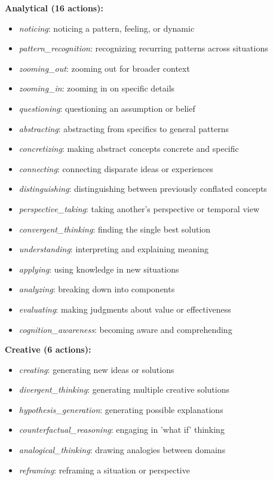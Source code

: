 \documentclass{article}
\begin{document}
\textbf{Analytical (16 actions):}
\begin{itemize}
    \item \textit{noticing}: noticing a pattern, feeling, or dynamic
    \item \textit{pattern\_recognition}: recognizing recurring patterns across situations
    \item \textit{zooming\_out}: zooming out for broader context
    \item \textit{zooming\_in}: zooming in on specific details
    \item \textit{questioning}: questioning an assumption or belief
    \item \textit{abstracting}: abstracting from specifics to general patterns
    \item \textit{concretizing}: making abstract concepts concrete and specific
    \item \textit{connecting}: connecting disparate ideas or experiences
    \item \textit{distinguishing}: distinguishing between previously conflated concepts
    \item \textit{perspective\_taking}: taking another's perspective or temporal view
    \item \textit{convergent\_thinking}: finding the single best solution
    \item \textit{understanding}: interpreting and explaining meaning
    \item \textit{applying}: using knowledge in new situations
    \item \textit{analyzing}: breaking down into components
    \item \textit{evaluating}: making judgments about value or effectiveness
    \item \textit{cognition\_awareness}: becoming aware and comprehending
\end{itemize}

\textbf{Creative (6 actions):}
\begin{itemize}
    \item \textit{creating}: generating new ideas or solutions
    \item \textit{divergent\_thinking}: generating multiple creative solutions
    \item \textit{hypothesis\_generation}: generating possible explanations
    \item \textit{counterfactual\_reasoning}: engaging in 'what if' thinking
    \item \textit{analogical\_thinking}: drawing analogies between domains
    \item \textit{reframing}: reframing a situation or perspective
\end{itemize}
\end{document}
